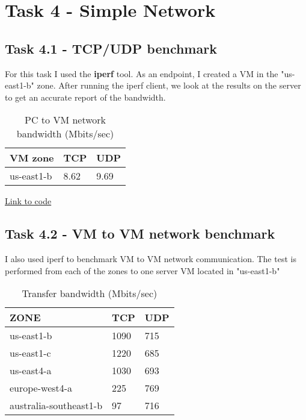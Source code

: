 \documentclass[paper=a4, fontsize=11pt]{scrartcl}
\numberwithin{equation}{section}    %
\numberwithin{figure}{section}      %
\numberwithin{table}{section}       %
\begin{document}

\section{Task 4 - Simple Network}
\subsection{Task 4.1 - TCP/UDP benchmark}

For this task I used the \textbf{iperf} tool.
As an endpoint, I created a VM in the "us-east1-b" zone.
After running the iperf client, we look at the results on the server to get an accurate report of the bandwidth.

\begin{table}[htb]
\centering
\caption{PC to VM network bandwidth (Mbits/sec)}
\begin{tabular}{|l|l|l|}
\hline
VM zone & TCP & UDP \\ \hline
us-east1-b            & 8.62          & 9.69          \\ \hline
\end{tabular}
\end{table}

\href{https://github.com/valenting/id2210-cloud-project-2018/blob/master/test_iperf.py}{Link to code}

\subsection{Task 4.2 - VM to VM network benchmark}

I also used iperf to benchmark VM to VM network communication.
The test is performed from each of the zones to one server VM located in "us-east1-b"

\begin{table}[htb]
\centering
\caption{Transfer bandwidth (Mbits/sec)}
\begin{tabular}{|l|l|l|}
\hline
ZONE & TCP & UDP \\ \hline
us-east1-b & 1090 & 715\\ \hline
us-east1-c & 1220 &  685   \\ \hline
us-east4-a & 1030 &  693   \\ \hline
europe-west4-a & 225 &  769   \\ \hline
australia-southeast1-b & 97 &  716   \\ \hline
\end{tabular}
\end{table}
\end{document}
